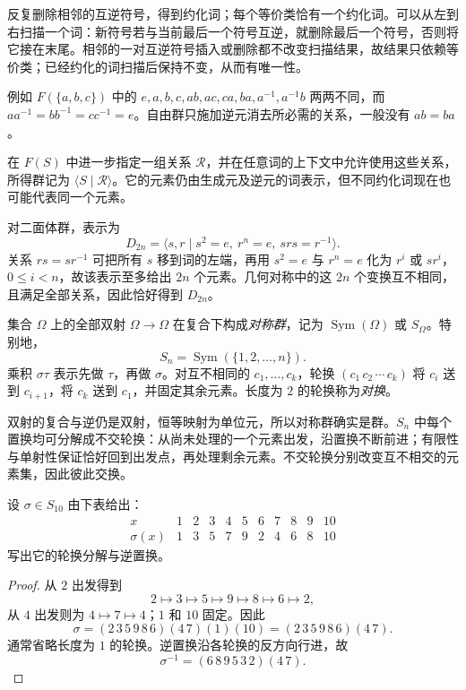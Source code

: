 \documentclass[lang=cn,a4paper,fontset=none,zihao=false,10pt,openany,twoside]{beautybook}
\numberwithin{algorithm}{chapter}
\begin{document}
反复删除相邻的互逆符号，得到约化词；每个等价类恰有一个约化词。可以从左到右扫描一个词：新符号若与当前最后一个符号互逆，就删除最后一个符号，否则将它接在末尾。相邻的一对互逆符号插入或删除都不改变扫描结果，故结果只依赖等价类；已经约化的词扫描后保持不变，从而有唯一性。

例如 $F(\{a,b,c\})$ 中的 $e,a,b,c,ab,ac,ca,ba,a^{-1},a^{-1}b$ 两两不同，而 $aa^{-1}=bb^{-1}=cc^{-1}=e$。自由群只施加逆元消去所必需的关系，一般没有 $ab=ba$。
\begin{definition}[群的表示]
在 $F(S)$ 中进一步指定一组关系 $\mathcal R$，并在任意词的上下文中允许使用这些关系，所得群记为 $\langle S\mid\mathcal R\rangle$。它的元素仍由生成元及逆元的词表示，但不同约化词现在也可能代表同一个元素。
\end{definition}
对二面体群，表示为
\[
 D_{2n}=\langle s,r\mid s^2=e,\ r^n=e,\ srs=r^{-1}\rangle.
\]
关系 $rs=sr^{-1}$ 可把所有 $s$ 移到词的左端，再用 $s^2=e$ 与 $r^n=e$ 化为 $r^i$ 或 $sr^i$，$0\le i<n$，故该表示至多给出 $2n$ 个元素。几何对称中的这 $2n$ 个变换互不相同，且满足全部关系，因此恰好得到 $D_{2n}$。

\begin{definition}[对称群与轮换]
集合 $\Omega$ 上的全部双射 $\Omega\to\Omega$ 在复合下构成\emph{对称群}，记为 $\operatorname{Sym}(\Omega)$ 或 $S_\Omega$。特别地，
\[
 S_n=\operatorname{Sym}(\{1,2,\ldots,n\}).
\]
乘积 $\sigma\tau$ 表示先做 $\tau$，再做 $\sigma$。对互不相同的 $c_1,\ldots,c_k$，轮换 $(c_1\,c_2\,\cdots\,c_k)$ 将 $c_i$ 送到 $c_{i+1}$，将 $c_k$ 送到 $c_1$，并固定其余元素。长度为 $2$ 的轮换称为\emph{对换}。
\end{definition}
双射的复合与逆仍是双射，恒等映射为单位元，所以对称群确实是群。$S_n$ 中每个置换均可分解成不交轮换：从尚未处理的一个元素出发，沿置换不断前进；有限性与单射性保证恰好回到出发点，再处理剩余元素。不交轮换分别改变互不相交的元素集，因此彼此交换。

\begin{example}[轮换分解]
设 $\sigma\in S_{10}$ 由下表给出：
\[
\begin{array}{c|rrrrrrrrrr}
x&1&2&3&4&5&6&7&8&9&10\\\hline
\sigma(x)&1&3&5&7&9&2&4&6&8&10
\end{array}
\]
写出它的轮换分解与逆置换。
\end{example}
\begin{proof}
从 $2$ 出发得到
\[
 2\mapsto3\mapsto5\mapsto9\mapsto8\mapsto6\mapsto2,
\]
从 $4$ 出发则为 $4\mapsto7\mapsto4$；$1$ 和 $10$ 固定。因此
\[
 \sigma=(2\,3\,5\,9\,8\,6)(4\,7)(1)(10)
 =(2\,3\,5\,9\,8\,6)(4\,7).
\]
通常省略长度为 $1$ 的轮换。逆置换沿各轮换的反方向行进，故
\[
 \sigma^{-1}=(6\,8\,9\,5\,3\,2)(4\,7).
\]
\end{proof}
\end{document}
